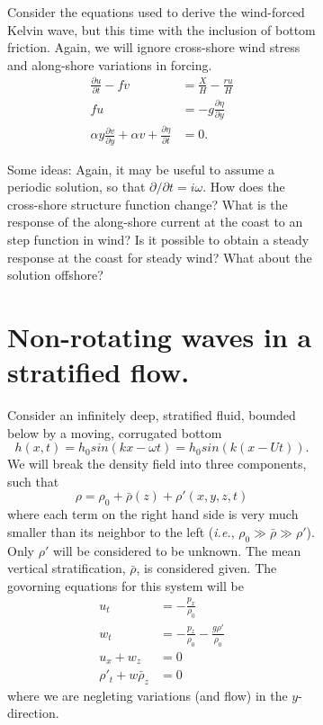 \documentclass[11pt]{report}
\numberwithin{equation}{section}
\begin{document}
\begin{figure}
\begin{figure}
Consider the equations used to derive the wind-forced Kelvin wave, but this time with the inclusion of bottom friction.  Again, we will ignore cross-shore wind stress and along-shore variations in forcing.
\begin{align}
\frac{\partial u}{\partial t} - fv &=  \frac{X}{H} - \frac{r u}{H} \\
    f u &= -g\frac{\partial \eta}{\partial y}  \\
    \alpha y \frac{\partial v}{\partial y} + \alpha v + \frac{\partial \eta}{\partial t} &= 0. 
\end{align}

Some ideas:  Again, it may be useful to assume a periodic solution, so that $\partial/\partial t = i \omega$.  How does the cross-shore structure function change?  What is the response of the along-shore current at the coast to an step function in wind?  Is it possible to obtain a steady response at the coast for steady wind?  What about the solution offshore?

\clearpage
\section{Non-rotating waves in a stratified flow.}
\label{prob:stratified_waves}

Consider an infinitely deep, stratified fluid, bounded below by a moving,
corrugated bottom
\begin{equation}
h(x,t) = h_0 sin (k x - \omega t) = h_0 sin (k (x - U t)).
\end{equation}
We will break the density field into three components, such that
\begin{equation}
\rho = \rho_0 + \bar{\rho}(z) + \rho'(x,y,z,t)
\end{equation}
where each term on the right hand side is very much smaller than its
neighbor to the left (\emph{i.e.}, $\rho_0 \gg \bar{\rho} \gg \rho'$).  Only
$\rho'$ will be considered to be unknown.  The mean vertical
stratification, $\bar{\rho}$, is considered given.  The govorning equations for this system will be
\begin{align}
u_t &= -\frac{p_x}{\rho_0} \\
w_t &= -\frac{p_z}{\rho_0} - \frac{g \rho'}{\rho_0} \\
u_x + w_z &= 0 \\
\rho'_t + w \bar{\rho}_z &= 0
\end{align}
where we are negleting variations (and flow) in the $y$-direction.


\end{figure}
\end{figure}
\end{document}
